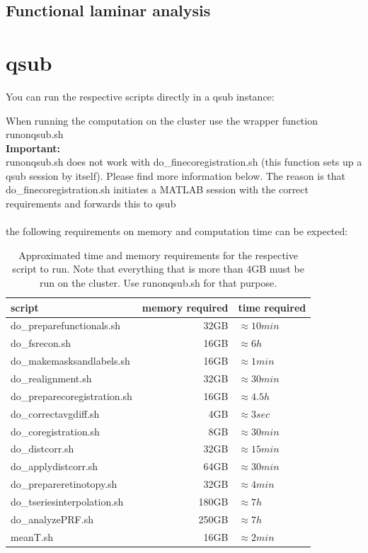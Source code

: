 \documentclass[12pt,a4paper]{scrartcl}
\begin{document}
\subsection{Functional laminar analysis}

\section{qsub}
You can run the respective scripts directly in a qsub instance:

\noindent When running the computation on the cluster use the wrapper function runonqsub.sh\\

\noindent \textbf{Important:}\\
\noindent runonqsub.sh does not work with do\_finecoregistration.sh (this function sets up a qsub session by itself). Please find more information below. The reason is that do\_finecoregistration.sh initiates a MATLAB session with the correct requirements and forwards this to qsub\\\\
\noindent the following requirements on memory and computation time can be expected:

\begin{table}[h]
\centering
\begin{tabular}{l | r | l}
\toprule
script & memory required & time required\\\hline
	do\_preparefunctionals.sh & 32GB & $\approx 10min$ \\\hline
	do\_fsrecon.sh & 16GB & $\approx 6h$ \\\hline
	do\_makemasksandlabels.sh & 16GB & $\approx 1min$ \\\hline
	do\_realignment.sh & 32GB & $\approx 30min$ \\\hline
	do\_preparecoregistration.sh & 16GB & $\approx 4.5h$ \\\hline
	do\_correctavgdiff.sh & 4GB & $\approx 3sec$ \\\hline
	do\_coregistration.sh & 8GB & $\approx 30min$ \\\hline
	do\_distcorr.sh & 32GB & $\approx 15min$ \\\hline
	do\_applydistcorr.sh & 64GB & $\approx 30min$ \\\hline
	do\_prepareretinotopy.sh & 32GB & $\approx 4min$ \\\hline
	do\_tseriesinterpolation.sh & 180GB & $\approx 7h$ \\\hline
	do\_analyzePRF.sh & 250GB & $\approx 7h$ \\\hline
	meanT.sh & 16GB & $\approx 2min$ \\\bottomrule
\end{tabular}
\caption[Approximated time and memory requirements when running on qsub]{Approximated time and memory requirements for the respective script to run. Note that everything that is more than 4GB must be run on the cluster. Use runonqsub.sh for that purpose.}
\label{tab:hardwarerequirements}
\end{table}
\end{document}
